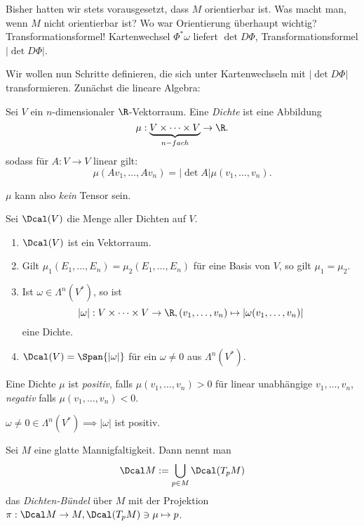 Bisher hatten wir stets vorausgesetzt, dass $M$ orientierbar ist. Was macht man, wenn $M$ nicht orientierbar ist? Wo war Orientierung überhaupt wichtig? Transformationsformel! Kartenwechsel \( \Phi^*\omega \) liefert \( \det D\Phi \), Transformationsformel \( |\det D\Phi| \).

Wir wollen nun Schritte definieren, die sich unter Kartenwechseln mit \( |\det D\Phi| \) transformieren. Zunächst die lineare Algebra:

\begin{defn*}[Dichte]
	Sei $V$ ein $n$-dimensionaler $\R$-Vektorraum. Eine \emph{Dichte} ist eine Abbildung
	\[ \mu: \underbrace{V \times \dots \times V}_{n-fach} \to \R. \]
	sodass für \( A: V \to V \) linear gilt:
	\[ \mu(Av_1,\dotsc,Av_n) = |\det A| \mu(v_1,\dotsc,v_n). \]
\end{defn*}

\begin{rem*}
	$\mu$ kann also \emph{kein} Tensor sein.
\end{rem*}

\begin{lem}\autolabel
	Sei $\Dcal(V)$ die Menge aller Dichten auf $V$.
	\begin{enumerate}[label={\roman*})]
		\item \( \Dcal(V) \) ist ein Vektorraum.
		\item Gilt \( \mu_1(E_1,\dotsc,E_n) = \mu_2(E_1,\dotsc,E_n) \) für eine Basis von $V$, so gilt \( \mu_1 = \mu_2. \)
		\item Ist $\omega \in \Lambda^n(V^*)$, so ist
			\[ |\omega|: V \times \dots \times V \to \R, (v_1,\dotsc,v_n) \mapsto |\omega(v_1,\dotsc,v_n)| \]
			eine Dichte.
		\item \( \Dcal(V) = \Span\{|\omega|\} \) für ein \( \omega \neq 0\) aus \( \Lambda^n(V^*) \).
	\end{enumerate}
\end{lem}

\begin{defn*}
	Eine Dichte $\mu$ ist \emph{positiv}, falls \( \mu(v_1,\dotsc,v_n) > 0 \) für linear unabhängige \( v_1,\dotsc,v_n \), \emph{negativ} falls \( \mu(v_1,\dotsc,v_n)<0 \).
\end{defn*}

\begin{rem*}
	$\omega \neq 0 \in \Lambda^n(V^*) \implies |\omega|$ ist positiv.
\end{rem*}

\begin{defn*}
	Sei $M$ eine glatte Mannigfaltigkeit. Dann nennt man
	\[ \Dcal M := \bigcup_{p \in M} \Dcal(T_pM) \]
	das \emph{Dichten-Bündel} über $M$ mit der Projektion \( \pi: \Dcal M \to M, \Dcal(T_pM) \ni \mu \mapsto p \).
\end{defn*}

